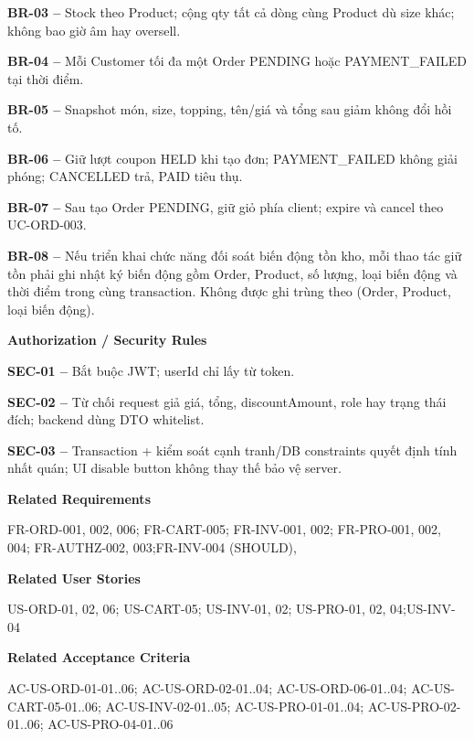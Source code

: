 \documentclass[11pt,a4paper,oneside]{report}
\begin{document}
\textbf{BR-03 --} Stock theo Product; cộng qty tất cả dòng cùng Product dù size khác; không bao giờ âm hay oversell.

\textbf{BR-04 --} Mỗi Customer tối đa một Order PENDING hoặc PAYMENT\_FAILED tại thời điểm.

\textbf{BR-05 --} Snapshot món, size, topping, tên/giá và tổng sau giảm không đổi hồi tố.

\textbf{BR-06 --} Giữ lượt coupon HELD khi tạo đơn; PAYMENT\_FAILED không giải phóng; CANCELLED trả, PAID tiêu thụ.

\textbf{BR-07 --} Sau tạo Order PENDING, giữ giỏ phía client; expire và cancel theo UC-ORD-003.

\textbf{BR-08 --} Nếu triển khai chức năng đối soát biến động tồn kho, mỗi thao tác giữ tồn phải ghi nhật ký biến động gồm Order, Product, số lượng, loại biến động và thời điểm trong cùng transaction. Không được ghi trùng theo (Order, Product, loại biến động).
\par

\par\smallskip\noindent\textcolor{sgublue}{\textbf{Authorization / Security Rules}}\par\nobreak
\textbf{SEC-01 --} Bắt buộc JWT; userId chỉ lấy từ token.

\textbf{SEC-02 --} Từ chối request giả giá, tổng, discountAmount, role hay trạng thái đích; backend dùng DTO whitelist.

\textbf{SEC-03 --} Transaction + kiểm soát cạnh tranh/DB constraints quyết định tính nhất quán; UI disable button không thay thế bảo vệ server.
\par

\par\smallskip\noindent\textcolor{sgublue}{\textbf{Related Requirements}}\par\nobreak
FR-ORD-001, 002, 006; FR-CART-005; FR-INV-001, 002; FR-PRO-001, 002, 004; FR-AUTHZ-002, 003;FR-INV-004 (SHOULD),
\par

\par\smallskip\noindent\textcolor{sgublue}{\textbf{Related User Stories}}\par\nobreak
US-ORD-01, 02, 06; US-CART-05; US-INV-01, 02; US-PRO-01, 02, 04;US-INV-04
\par

\par\smallskip\noindent\textcolor{sgublue}{\textbf{Related Acceptance Criteria}}\par\nobreak
AC-US-ORD-01-01..06; AC-US-ORD-02-01..04; AC-US-ORD-06-01..04; AC-US-CART-05-01..06; AC-US-INV-02-01..05; AC-US-PRO-01-01..04; AC-US-PRO-02-01..06; AC-US-PRO-04-01..06
\par
\end{document}

